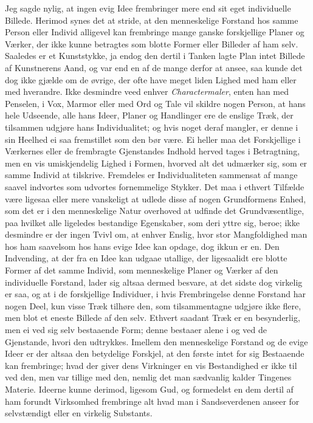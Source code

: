 \documentclass[12pt,a4paper]{article}
\newcommand{\opage}[1]{\marginnote{\footnotesize\textit{[#1]}}}
\begin{document}
Jeg sagde nylig, at ingen evig Idee frembringer mere end sit eget individuelle
Billede. Herimod synes det at stride, at den menneskelige Forstand hos samme
Person eller Individ alligevel kan frembringe mange ganske forskjellige Planer og
Værker, der ikke kunne betragtes som blotte Former eller Billeder af ham
\opage{205} selv. Saaledes er et Kunststykke, ja endog den dertil i Tanken lagte Plan intet
Billede af Kunstnerens Aand, og var end en af de mange derfor at ansee, saa kunde
det dog ikke gjælde om de øvrige, der ofte have meget liden Lighed med ham eller
med hverandre. Ikke desmindre veed enhver \emph{Charactermaler}, enten han med
Penselen, i Vox, Marmor eller med Ord og Tale vil skildre nogen Person, at hans
hele Udseende, alle hans Ideer, Planer og Handlinger ere de enslige Træk, der
tilsammen udgjøre hans Individualitet; og hvis noget deraf mangler, er denne i sin
Heelhed ei saa fremstillet som den bør være. Ei heller maa det Forskjellige i
Værkernes eller de frembragte Gjenstandes Indhold herved tages i Betragtning, men
en vis umiskjendelig Lighed i Formen, hvorved alt det udmærker sig, som er samme
Individ at tilskrive. Fremdeles er Individualiteten sammensat af mange saavel
indvortes som udvortes fornemmelige Stykker. Det maa i ethvert Tilfælde være
ligesaa eller mere vanskeligt at udlede disse af nogen Grundformens Enhed, som det
er i den menneskelige Natur overhoved at udfinde det Grundvæsentlige, paa hvilket
alle ligeledes bestandige Egenskaber, som deri yttre sig, beroe; ikke desmindre er
der ingen Tvivl om, at enhver Enslig, hvor stor Mangfoldighed man hos ham
saavelsom hos hans evige Idee kan opdage, dog ikkun er en. Den Indvending, at der
fra en Idee kan udgaae utallige, der ligesaalidt
\opage{206} ere blotte Former af det samme Individ, som menneskelige Planer og Værker af den
individuelle Forstand, lader sig altsaa dermed besvare, at det sidste dog virkelig
er saa, og at i de forskjellige Individuer, i hvis Frembringelse denne Forstand
har nogen Deel, kun visse Træk tilhøre den, som tilsammentagne udgjøre ikke flere,
men blot et eneste Billede af den selv. Ethvert saadant Træk er en besynderlig,
men ei ved sig selv bestaaende Form; denne bestaaer alene i og ved de Gjenstande,
hvori den udtrykkes. Imellem den menneskelige Forstand og de evige Ideer er der
altsaa den betydelige Forskjel, at den første intet for sig Bestaaende kan
frembringe; hvad der giver dens Virkninger en vis Bestandighed er ikke til ved
den, men var tillige med den, nemlig det man sædvanlig kalder Tingenes Materie.
Ideerne kunne derimod, ligesom Gud, og formedelst en dem dertil af ham forundt
Virksomhed frembringe alt hvad man i Sandseverdenen anseer for selvstændigt eller
en virkelig Substants.
\end{document}
